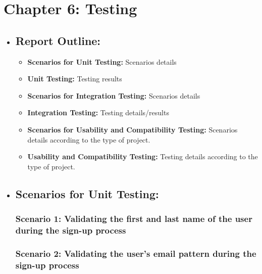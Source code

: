 \documentclass{article}
\begin{document}


\newpage
\section{Chapter 6: Testing}
\begin{itemize}
\item \subsection{Report Outline:}
\begin{itemize}
    \item \textbf{Scenarios for Unit Testing:} Scenarios details

    \item \textbf{Unit Testing:} Testing results
    
    \item \textbf{Scenarios for Integration Testing:} Scenarios details
    
    \item \textbf{Integration Testing:} Testing details/results
    
    \item \textbf{Scenarios for Usability and Compatibility Testing:} Scenarios details according to the type of project.
    \item \textbf{Usability and Compatibility Testing:} Testing details according to the type of project.
\end{itemize}
\newpage
\item \subsection{Scenarios for Unit Testing:}
\subsubsection{\label{sec:scenario1} Scenario 1: Validating the first and last name of the user during the sign-up process}
\subsubsection{\label{sec:scenario2} Scenario 2: Validating the user's email pattern during the sign-up process}

\end{itemize}
\end{document}
